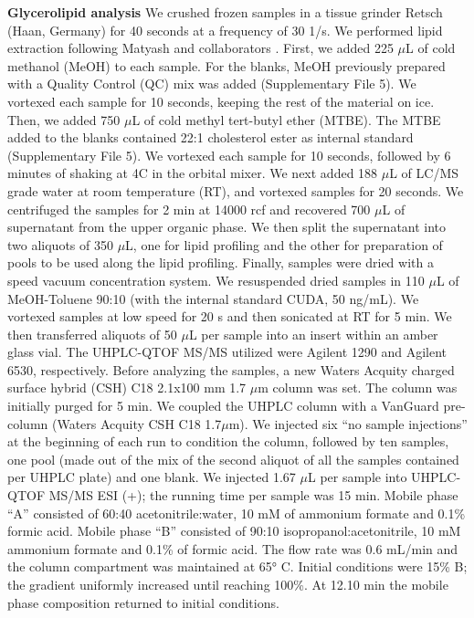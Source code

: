 \documentclass[9pt,twocolumn,twoside,lineno]{BioRxiv}
\begin{document}
\textbf{Glycerolipid analysis} 
We crushed frozen samples in a tissue grinder Retsch (Haan, Germany) for 40 seconds at a frequency of 30 1/s. 
We performed lipid extraction following Matyash and collaborators \cite{Matyash2008-ue}. 
First, we added 225 $\mu$L of cold methanol (MeOH) to each sample. 
For the blanks, MeOH previously prepared with a Quality Control (QC) mix was added (Supplementary File 5).
We vortexed each sample for 10 seconds, keeping the rest of the material on ice. 
Then, we added 750 $\mu$L of cold methyl tert-butyl ether (MTBE). 
The MTBE added to the blanks contained 22:1 cholesterol ester as internal standard (Supplementary File 5). 
We vortexed each sample for 10 seconds, followed by 6 minutes of shaking at 4\degree C in the orbital mixer. 
We next added 188 $\mu$L of LC/MS grade water at room temperature (RT), and vortexed samples for 20 seconds.
We centrifuged the samples for 2 min at 14000 rcf and recovered 700 $\mu$L of supernatant from the upper organic phase. 
We then split the supernatant into two aliquots of 350 $\mu$L, one for lipid profiling and the other for preparation of pools to be used along the lipid profiling. 
Finally, samples were dried with a speed vacuum concentration system.
We resuspended dried samples in 110 $\mu$L of MeOH-Toluene 90:10 (with the internal standard CUDA, 50 ng/mL). 
We vortexed samples at low speed for 20 s and then sonicated at RT for 5 min. 
We then transferred aliquots of 50 $\mu$L per sample into an insert within an amber glass vial.
The UHPLC-QTOF MS/MS utilized were Agilent 1290 and Agilent 6530, respectively. 
Before analyzing the samples, a new Waters Acquity charged surface hybrid (CSH) C18 2.1x100 mm 1.7 $\mu$m column was set. 
The column was initially purged for 5 min. 
We coupled the UHPLC column with a VanGuard pre-column (Waters Acquity CSH C18 1.7$\mu$m). 
We injected six “no sample injections” at the beginning of each run to condition the column, followed by ten samples, one pool (made out of the mix of the second aliquot of all the samples contained per UHPLC plate) and one blank.
We injected 1.67 $\mu$L per sample into UHPLC-QTOF MS/MS ESI (+); the running time per sample was 15 min. 
Mobile phase “A” consisted of 60:40 acetonitrile:water, 10 mM of ammonium formate and 0.1\% formic acid. 
Mobile phase “B” consisted of 90:10 isopropanol:acetonitrile, 10 mM ammonium formate and 0.1\% of formic acid. 
The flow rate was 0.6 mL/min and the column compartment was maintained at 65° C. Initial conditions were 15\% B; the gradient uniformly increased until reaching 100\%. 
At 12.10 min the mobile phase composition returned to initial conditions.
\end{document}
